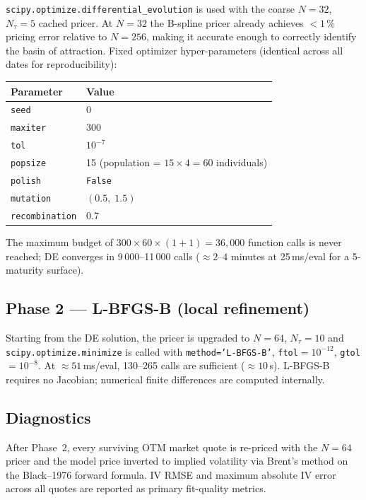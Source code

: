 \documentclass[11pt,a4paper]{article}
\begin{document}
\texttt{scipy.optimize.differential\_evolution} is used with the coarse
$N=32$, $N_\tau=5$ cached pricer.  At $N=32$ the B-spline pricer already
achieves $<1\,\%$ pricing error relative to $N=256$, making it accurate
enough to correctly identify the basin of attraction.
Fixed optimizer hyper-parameters (identical across all dates for
reproducibility):
\begin{center}
\begin{tabular}{ll}
\toprule
Parameter & Value \\
\midrule
\texttt{seed} & 0 \\
\texttt{maxiter} & 300 \\
\texttt{tol} & $10^{-7}$ \\
\texttt{popsize} & 15 (population = $15 \times 4 = 60$ individuals) \\
\texttt{polish} & \texttt{False} \\
\texttt{mutation} & $(0.5,\; 1.5)$ \\
\texttt{recombination} & 0.7 \\
\bottomrule
\end{tabular}
\end{center}

The maximum budget of $300 \times 60 \times (1 + 1) = 36{,}000$
function calls is never reached; DE converges in 9\,000--11\,000 calls
($\approx 2\text{--}4$ minutes at 25\,ms/eval for a 5-maturity surface).

\subsection{Phase 2 — L-BFGS-B (local refinement)}

Starting from the DE solution, the pricer is upgraded to $N=64$, $N_\tau=10$
and \texttt{scipy.optimize.minimize} is called with
\texttt{method='L-BFGS-B'}, \texttt{ftol}$=10^{-12}$,
\texttt{gtol}$=10^{-8}$.
At $\approx 51$\,ms/eval, 130--265 calls are sufficient ($\approx 10$\,s).
L-BFGS-B requires no Jacobian; numerical finite differences are computed
internally.

\subsection{Diagnostics}

After Phase~2, every surviving OTM market quote is re-priced with the
$N=64$ pricer and the model price inverted to implied volatility via
Brent's method on the Black--1976 forward formula.
IV RMSE and maximum absolute IV error across all quotes are reported
as primary fit-quality metrics.
\end{document}
